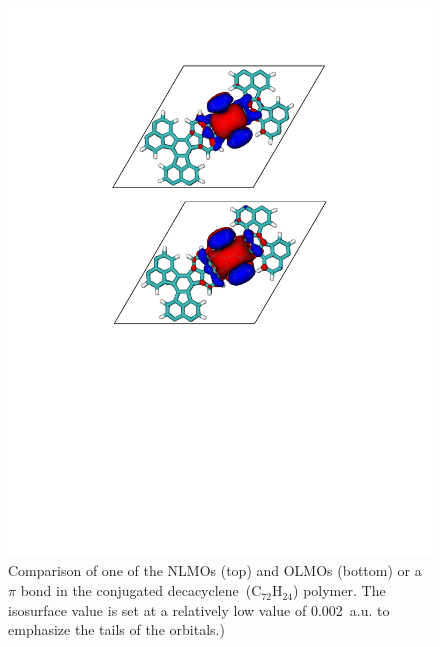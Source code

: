 \documentclass[aps,prl,reprint,amsmath,amssymb]{revtex4-1}
\begin{document}
\begin{figure}[htbp]
\includegraphics[scale=0.6]{figure_5.pdf} 
  \caption{Comparison of one of the NLMOs (top) and OLMOs (bottom) or a $\pi$ bond in the conjugated decacyclene~(C$_{72}$H$_{24}$) polymer. The isosurface value is set at a relatively low value of 0.002~a.u. to emphasize the tails of the orbitals.)}
\label{fig:NLMOsvsOLMOs}
\end{figure}



\end{document}
